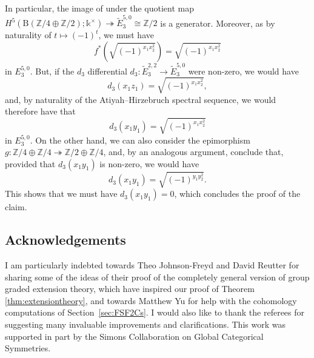 \documentclass[pdftex]{sigma}
\numberwithin{equation}{section}
\begin{document}
 In particular, the image of  under the quotient map $H^5(\mathrm{B}(\mathbb{Z}/4\oplus\mathbb{Z}/2);\mathds{k}^{\times})\twoheadrightarrow \widetilde{E}^{5,0}_3\cong \mathbb{Z}/2$ is a generator. Moreover, as  by naturality of $t\mapsto (-1)^t$, we must have
 \[
 f^*(\sqrt{(-1)^{x_1x_2^2}}) = \sqrt{(-1)^{x_1x_2^2}}
 \]
 in $E^{5,0}_3$. But, if the $d_3$ differential $d_3\colon\widetilde{E}^{2,2}_3\rightarrow \widetilde{E}^{5,0}_3$ were non-zero, we would have
 \[d_3(x_1z_1) = \sqrt{(-1)^{x_1x_2^2}},
 \]
 and, by naturality of the Atiyah--Hirzebruch spectral sequence, we would therefore have that
 \[
 d_3(x_1y_1) = \sqrt{(-1)^{x_1x_2^2}}
 \]
in $E^{5,0}_3$. On the other hand, we can also consider the epimorphism $g\colon\mathbb{Z}/4\oplus\mathbb{Z}/4\twoheadrightarrow \mathbb{Z}/2\oplus\mathbb{Z}/4$, and, by an analogous argument, conclude that, provided that $d_3(x_1y_1)$ is non-zero, we would have \[d_3(x_1y_1)=\sqrt{(-1)^{y_1y_2^2}}.\] This shows that we must have $d_3(x_1y_1) = 0$, which concludes the proof of the claim.

\subsection*{Acknowledgements}

I am particularly indebted towards Theo Johnson-Freyd and David Reutter for sharing some of the ideas of their proof of the completely general version of group graded extension theory, which have inspired our proof of Theorem \ref{thm:extensiontheory}, and towards Matthew Yu for help with the cohomology computations of Section~\ref{sec:FSF2Cs}. I would also like to thank the referees for suggesting many invaluable improvements and clarifications. This work was supported in part by the Simons Collaboration on Global Categorical Symmetries.
\end{document}
